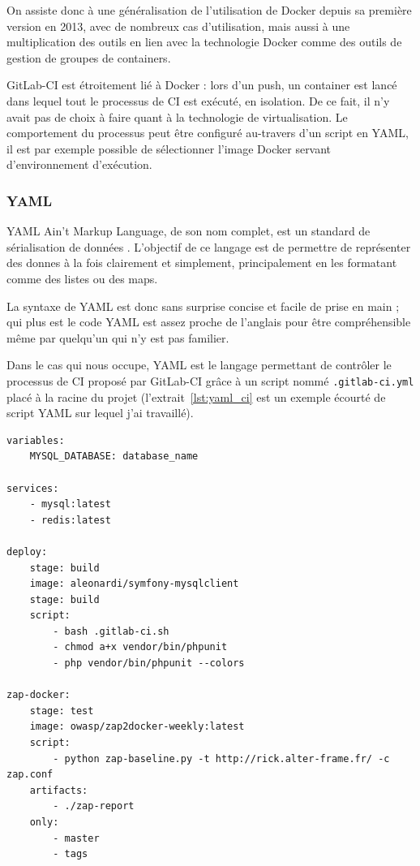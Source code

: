 On assiste donc à une généralisation de l'utilisation de Docker depuis sa première version en 2013, avec de nombreux cas d'utilisation\cite{docker_use_cases}, mais aussi à une multiplication des outils en lien avec la technologie Docker comme des outils de gestion de groupes de containers\cite{kubernetes}\cite{swarm}.

GitLab-CI est étroitement lié à Docker : lors d'un push, un container est lancé dans lequel tout le processus de CI est exécuté, en isolation. De ce fait, il n'y avait pas de choix à faire quant à la technologie de virtualisation. Le comportement du processus peut être configuré au-travers d'un script en YAML, il est par exemple possible de sélectionner l'image Docker servant d'environnement d'exécution.

\subsubsection{YAML}
YAML Ain't Markup Language\cite{yaml}, de son nom complet, est un \og standard de sérialisation de données \fg. L'objectif de ce langage est de permettre de représenter des donnes à la fois clairement et simplement, principalement en les formatant comme des listes ou des maps.

La syntaxe de YAML est donc sans surprise concise et facile de prise en main\cite{yaml_refcard} ; qui plus est le code YAML est assez proche de l'anglais pour être compréhensible même par quelqu'un qui n'y est pas familier.

Dans le cas qui nous occupe, YAML est le langage permettant de contrôler le processus de CI proposé par GitLab-CI grâce à un script nommé \verb|.gitlab-ci.yml| placé à la racine du projet (l'extrait~\ref{lst:yaml_ci} est un exemple écourté de script YAML sur lequel j'ai travaillé).

\begin{minipage}{\linewidth}
	\begin{lstlisting}[caption={Script de contrôle de processus de CI en YAML},label={lst:yaml_ci}]
variables:
    MYSQL_DATABASE: database_name

services:
    - mysql:latest
    - redis:latest

deploy:
    stage: build
    image: aleonardi/symfony-mysqlclient
    stage: build
    script:
        - bash .gitlab-ci.sh
        - chmod a+x vendor/bin/phpunit
        - php vendor/bin/phpunit --colors

zap-docker:
    stage: test
    image: owasp/zap2docker-weekly:latest
    script:
        - python zap-baseline.py -t http://rick.alter-frame.fr/ -c zap.conf
    artifacts:
        - ./zap-report
    only:
        - master
        - tags
    \end{lstlisting}
\end{minipage}

